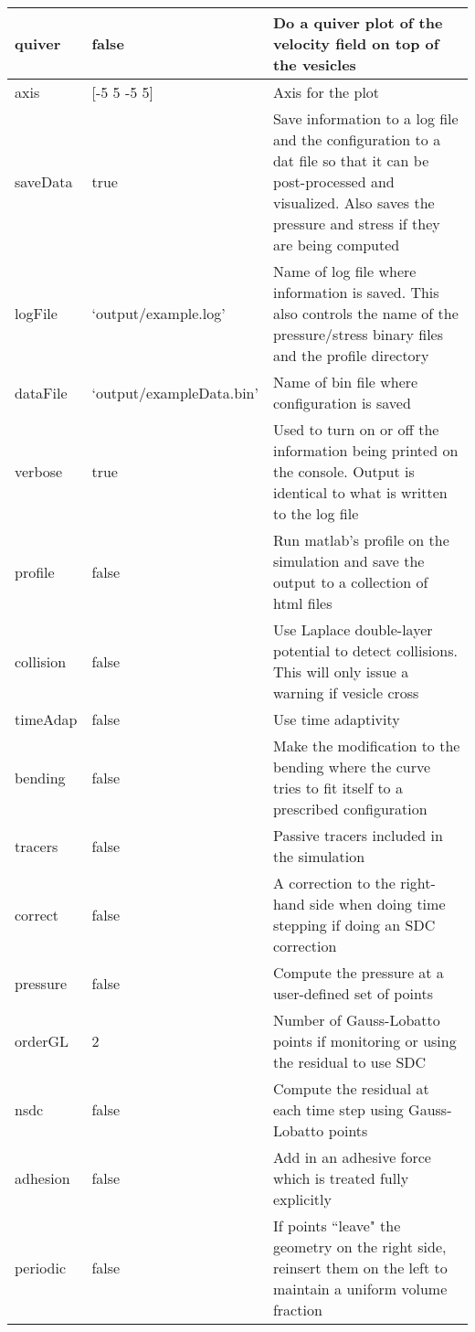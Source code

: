 \documentclass[12pt]{article}
\begin{document}
\begin{longtable}{|l|l|m{6cm}|}
quiver & false &  
Do a quiver plot of the velocity field on top of the vesicles \\ \hline
axis & [-5 5 -5 5] &  
Axis for the plot \\ \hline
saveData & true &  
Save information to a log file and the configuration to a dat file so
that it can be post-processed and visualized.  Also saves the pressure
and stress if they are being computed \\ \hline
logFile & `output/example.log' &  
Name of log file where information is saved.  This also controls the
name of the pressure/stress binary files and the profile directory \\ \hline
dataFile & `output/exampleData.bin' &  
Name of bin file where configuration is saved \\ \hline
verbose & true &  
Used to turn on or off the information being printed on the console.
Output is identical to what is written to the log file \\ \hline
profile & false &  
Run matlab's profile on the simulation and save the output to a
collection of html files \\ \hline
collision & false &  
Use Laplace double-layer potential to detect collisions.  This will
only issue a warning if vesicle cross \\ \hline
timeAdap & false &  
Use time adaptivity \\ \hline
bending & false &
Make the modification to the bending where the curve tries to fit itself
to a prescribed configuration \\ \hline
tracers & false &
Passive tracers included in the simulation \\ \hline
correct & false &
A correction to the right-hand side when doing time stepping if doing an
SDC correction \\ \hline
pressure & false &
Compute the pressure at a user-defined set of points \\ \hline
orderGL & 2 &
Number of Gauss-Lobatto points if monitoring or using the residual to
use SDC \\ \hline
nsdc & false &
Compute the residual at each time step using Gauss-Lobatto points \\  \hline
adhesion & false & 
Add in an adhesive force which is treated fully explicitly \\ \hline
periodic & false & 
If points ``leave" the geometry on the right side, reinsert them on the
left to maintain a uniform volume fraction \\ \hline

\end{longtable}
\end{document}
